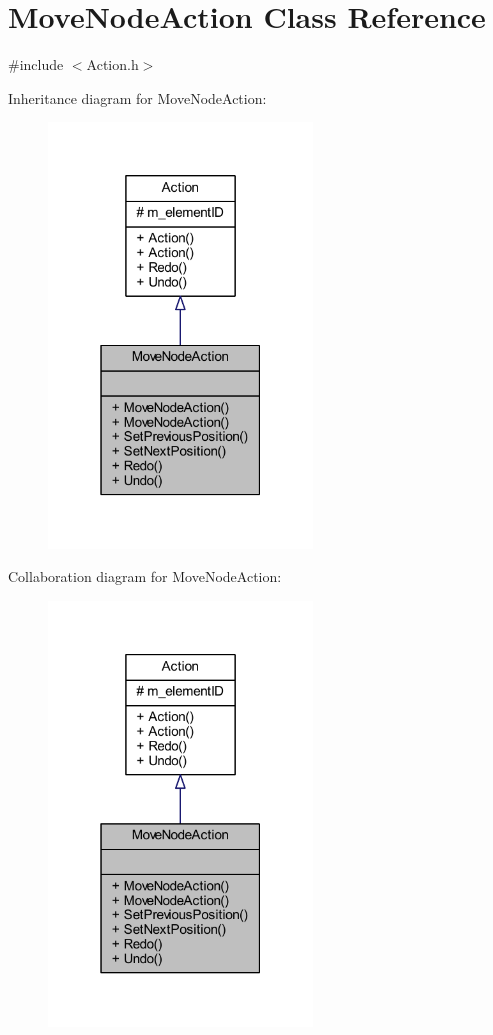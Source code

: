 \hypertarget{class_move_node_action}{}\section{Move\+Node\+Action Class Reference}
\label{class_move_node_action}


{\ttfamily \#include $<$Action.\+h$>$}



Inheritance diagram for Move\+Node\+Action\+:
\nopagebreak
\begin{figure}[H]
\begin{center}
\leavevmode
\includegraphics[width=199pt]{class_move_node_action__inherit__graph}
\end{center}
\end{figure}


Collaboration diagram for Move\+Node\+Action\+:
\nopagebreak
\begin{figure}[H]
\begin{center}
\leavevmode
\includegraphics[width=199pt]{class_move_node_action__coll__graph}
\end{center}
\end{figure}
